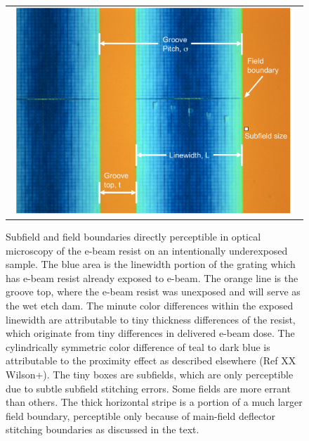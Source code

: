 \documentclass[]{spie}  %
\begin{document}
\begin{figure}
\begin{center}
 \begin{tabular}{c}
    \includegraphics[width=0.96\textwidth]{figs/subfields_TJ04_Zeiss.pdf}
   \end{tabular}
  \end{center}
  \caption[TJ04 under Zeiss]{\label{fig:TJ04Zeiss} Subfield and field boundaries directly perceptible in optical microscopy of the e-beam resist on an intentionally underexposed sample.  The blue area is the linewidth portion of the grating which has e-beam resist already exposed to e-beam.  The orange line is the groove top, where the e-beam resist was unexposed and will serve as the wet etch dam.  The minute color differences within the exposed linewidth are attributable to tiny thickness differences of the resist, which originate from tiny differences in delivered e-beam dose.  The cylindrically symmetric color difference of teal to dark blue is attributable to the proximity effect as described elsewhere (Ref XX Wilson+).  The tiny boxes are subfields, which are only perceptible due to subtle subfield stitching errors.  Some fields are more errant than others.  The thick horizontal stripe is a portion of a much larger field boundary, perceptible only because of main-field deflector stitching boundaries as discussed in the text.}
\end{figure}
\end{document}
